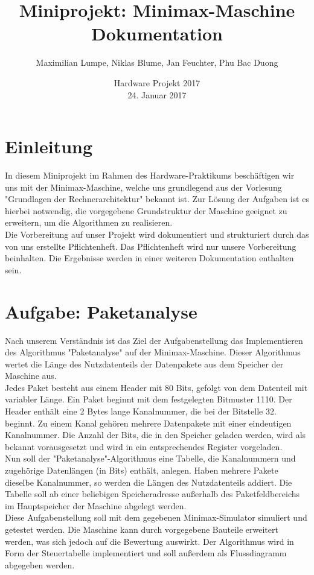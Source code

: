 \documentclass[12pt,titlepage,german,a4]{article}
\begin{document}
    \title{\bf Miniprojekt: Minimax-Maschine \\ Dokumentation}
    \date{Hardware Projekt 2017 \\ 24. Januar 2017}
    \author{Maximilian Lumpe, Niklas Blume, Jan Feuchter, Phu Bac Duong}
    \maketitle

    \tableofcontents

    \newpage

    \section{Einleitung}
    In diesem Miniprojekt im Rahmen des Hardware-Praktikums besch{\"a}ftigen wir uns mit der Minimax-Maschine, welche uns grundlegend aus der Vorlesung "Grundlagen der Rechnerarchitektur" bekannt ist. Zur L{\"o}sung der Aufgaben ist es hierbei notwendig, die vorgegebene Grundstruktur der Maschine geeignet zu erweitern, um die Algorithmen zu realisieren.\\Die Vorbereitung auf unser Projekt wird dokumentiert und strukturiert durch das von uns erstellte Pflichtenheft. Das Pflichtenheft wird nur unsere Vorbereitung beinhalten. Die Ergebnisse werden in einer weiteren Dokumentation enthalten sein.

    \section{Aufgabe: Paketanalyse}
    Nach unserem Verst{\"a}ndnis ist das Ziel der Aufgabenstellung das Implementieren des Algorithmus "Paketanalyse" auf der Minimax-Maschine. Dieser Algorithmus wertet die L{\"a}nge des Nutzdatenteils der Datenpakete aus dem Speicher der Maschine aus.\\Jedes Paket besteht aus einem Header mit 80 Bits, gefolgt von dem Datenteil mit variabler L{\"a}nge. Ein Paket beginnt mit dem festgelegten Bitmuster 1110. Der Header enth{\"a}lt eine 2 Bytes lange Kanalnummer, die bei der Bitstelle 32. beginnt. Zu einem Kanal geh{\"o}ren mehrere Datenpakete mit einer eindeutigen Kanalnummer. Die Anzahl der Bits, die in den Speicher geladen werden, wird als bekannt vorausgesetzt und wird in ein entsprechendes Register vorgeladen.\\Nun soll der "Paketanalyse"-Algorithmus eine Tabelle, die Kanalnummern und zugeh{\"o}rige Datenl{\"a}ngen (in Bits) enth{\"a}lt, anlegen. Haben mehrere Pakete dieselbe Kanalnummer, so werden die L{\"a}ngen des Nutzdatenteils addiert. Die Tabelle soll ab einer beliebigen Speicheradresse au{\ss}erhalb des Paketfeldbereichs im Hauptspeicher der Maschine abgelegt werden.\\Diese Aufgabenstellung soll mit dem gegebenen Minimax-Simulator simuliert und getestet werden. Die Maschine kann durch vorgegebene Bauteile erweitert werden, was sich jedoch auf die Bewertung auswirkt. Der Algorithmus wird in Form der Steuertabelle implementiert und soll au{\ss}erdem als Flussdiagramm abgegeben werden.
\end{document}
